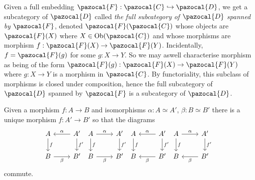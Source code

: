    \begin{remark}
        Given a full embedding $\pazocal{F}: \pazocal{C}\hookrightarrow \pazocal{D}$, we get a subcategory of $\pazocal{D}$ called \emph{the full subcategory of $\pazocal{D}$ spanned by $\pazocal{F}$}, denoted $\pazocal{F}(\pazocal{C})$ whose objects are $\pazocal{F}(X)$ where $X\in \Ob(\pazocal{C})$ and whose morphisms are morphism $f: \pazocal{F}(X)\rightarrow\pazocal{F}(Y)$. Incidentally, $f = \pazocal{F}(g)$ for some $g : X\rightarrow Y$. So we may aswell characterise morphism as being of the form $\pazocal{F}(g) : \pazocal{F}(X)\rightarrow \pazocal{F}(Y)$ where $g: X\rightarrow Y$ is a morphism in $\pazocal{C}$. By functoriality, this subclass of morphisms is closed under composition, hence the full subcategory of $\pazocal{D}$ spanned by $\pazocal{F}$ is a subcategory of $\pazocal{D}$.
    \end{remark}
    \begin{lemma}\label{UniqueChangeOfDomainAndCodomainViaIsos}
        Given a morphism $f: A\rightarrow B$ and isomorphisms $\alpha: A\simeq A'$, $\beta : B\simeq B'$ there is a unique morphism $f: A' \rightarrow B'$ so that the diagrams
        $$
            \begin{tikzcd}
                A\arrow[d, "f"] & A'\arrow[l,"\alpha",swap]\arrow[d,"f'"]\\
                B \arrow[r,"\beta",swap] & B' 
            \end{tikzcd}
            \begin{tikzcd}
                A\arrow[r,"\alpha"]\arrow[d, "f"] & A'\arrow[d,"f'"]\\
                B \arrow[r,"\beta",swap] & B'
            \end{tikzcd}
            \begin{tikzcd}
                A\arrow[d, "f"] & A'\arrow[l,"\alpha",swap]\arrow[d,"f'"]\\
                B & B' \arrow[l,"\beta"]
            \end{tikzcd}
            \begin{tikzcd}
                A\arrow[d, "f"]\arrow[r,"\alpha"] & A' \arrow[d,"f'"] \\
                B & B' \arrow[l,"\beta"]
            \end{tikzcd}
        $$
        commute.
    \end{lemma}
